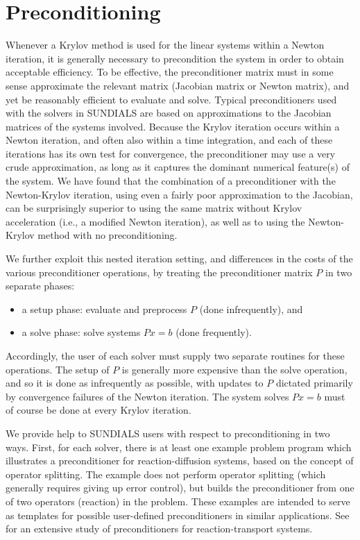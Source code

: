 \section{Preconditioning}\label{s:preconditioning}

Whenever a Krylov method is used for the linear systems within a
Newton iteration, it is generally necessary to precondition the system
in order to obtain acceptable efficiency.  To be effective, the
preconditioner matrix must in some sense approximate the relevant
matrix (Jacobian matrix or Newton matrix), and yet be reasonably
efficient to evaluate and solve.  Typical preconditioners used with
the solvers in SUNDIALS are based on approximations to the Jacobian matrices
of the systems involved.  Because the Krylov iteration occurs within a
Newton iteration, and often also within a time integration, and each
of these iterations has its own test for convergence, the
preconditioner may use a very crude approximation, as long as it
captures the dominant numerical feature(s) of the system.  
We have found that the combination of a preconditioner with the
Newton-Krylov iteration, using even a fairly poor approximation to
the Jacobian, can be surprisingly superior to using the same matrix
without Krylov acceleration (i.e., a modified Newton iteration), as
well as to using the Newton-Krylov method with no preconditioning.

We further exploit this nested iteration setting, and differences in
the costs of the various preconditioner operations, by treating the
preconditioner matrix $P$ in two separate phases:
\begin{itemize}
\item a setup phase: evaluate and preprocess $P$ (done infrequently), and
\item a solve phase: solve systems $Px = b$ (done frequently).
\end{itemize}
Accordingly, the user of each solver must supply two separate
routines for these operations.  The setup of $P$ is generally more
expensive than the solve operation, and so it is done as infrequently
as possible, with updates to $P$ dictated primarily by convergence
failures of the Newton iteration.  The system solves $Px = b$ must of
course be done at every Krylov iteration.

We provide help to SUNDIALS users with respect to preconditioning in
two ways.  First, for each solver, there is at least one example
problem program which illustrates a preconditioner for
reaction-diffusion systems, based on the concept of operator
splitting.  The example does not perform operator splitting (which
generally requires giving up error control), but builds the
preconditioner from one of two operators (reaction) in the problem.
These examples are intended to serve as templates for possible
user-defined preconditioners in similar applications.  See
\cite{BrHi:89} for an extensive study of preconditioners for
reaction-transport systems.

